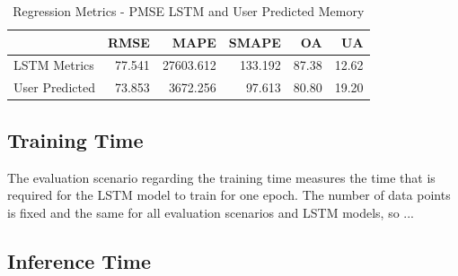       \begin{table}
        \centering
        \caption{Regression Metrics - PMSE LSTM and User Predicted Memory}
        \label{tab:regression-metrics-pmse-lstm-user-predicted-memory}

        \begin{tabular}{|l|rrrrr|}
          \toprule
          {} &    RMSE &       MAPE &    SMAPE &     OA &     UA \\
          \midrule
          LSTM Metrics   &  77.541 &  27603.612 &  133.192 &  87.38 &  12.62 \\
          User Predicted &  73.853 &   3672.256 &   97.613 &  80.80 &  19.20 \\
          \bottomrule
        \end{tabular}
      \end{table}

  \subsection{Training Time}
  \label{sec:training-time-evaluation-scenarios}

    The evaluation scenario regarding the training time measures the time that is required for the LSTM model to train for one epoch. The number of data points is fixed and the same for all evaluation scenarios and LSTM models, so ...

  \subsection{Inference Time}
  \label{sec:inference-time-evaluation-scenarios}

